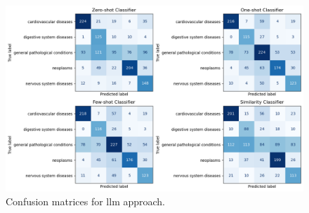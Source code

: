 \begin{figure}[ht]
    \centering
    \includegraphics[width=\columnwidth]{report/figures/conf-matrices-llm.png}
    \caption{Confusion matrices for llm approach.}
    \label{fig:conf-matrices-llm}
\end{figure}